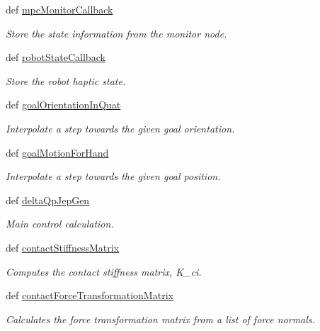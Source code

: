 \begin{DoxyCompactItemize}
def \hyperlink{classhrl__haptic__mpc_1_1haptic__mpc_1_1_haptic_m_p_c_a41e68724c5a495b92a307bb2af990ee2}{mpc\-Monitor\-Callback}
\begin{DoxyCompactList}\small\item\em \-Store the state information from the monitor node. \end{DoxyCompactList}\item 
def \hyperlink{classhrl__haptic__mpc_1_1haptic__mpc_1_1_haptic_m_p_c_a58577a15affd85287178ded95712a581}{robot\-State\-Callback}
\begin{DoxyCompactList}\small\item\em \-Store the robot haptic state. \end{DoxyCompactList}\item 
def \hyperlink{classhrl__haptic__mpc_1_1haptic__mpc_1_1_haptic_m_p_c_a26e3eebd49d80a303a54856d27602020}{goal\-Orientation\-In\-Quat}
\begin{DoxyCompactList}\small\item\em \-Interpolate a step towards the given goal orientation. \end{DoxyCompactList}\item 
def \hyperlink{classhrl__haptic__mpc_1_1haptic__mpc_1_1_haptic_m_p_c_a38eb29816d765f3f078b77d0d3894512}{goal\-Motion\-For\-Hand}
\begin{DoxyCompactList}\small\item\em \-Interpolate a step towards the given goal position. \end{DoxyCompactList}\item 
def \hyperlink{classhrl__haptic__mpc_1_1haptic__mpc_1_1_haptic_m_p_c_ad5942f95d040ca775cc6ff2be0860043}{delta\-Qp\-Jep\-Gen}
\begin{DoxyCompactList}\small\item\em \-Main control calculation. \end{DoxyCompactList}\item 
def \hyperlink{classhrl__haptic__mpc_1_1haptic__mpc_1_1_haptic_m_p_c_a6bf11cccac2eaef98e1377d7e354f868}{contact\-Stiffness\-Matrix}
\begin{DoxyCompactList}\small\item\em \-Computes the contact stiffness matrix, \-K\-\_\-ci. \end{DoxyCompactList}\item 
def \hyperlink{classhrl__haptic__mpc_1_1haptic__mpc_1_1_haptic_m_p_c_a5b3da70daff165425c6e635ff38749cc}{contact\-Force\-Transformation\-Matrix}
\begin{DoxyCompactList}\small\item\em \-Calculates the force transformation matrix from a list of force normals. \end{DoxyCompactList}\item 

\end{DoxyCompactItemize}
